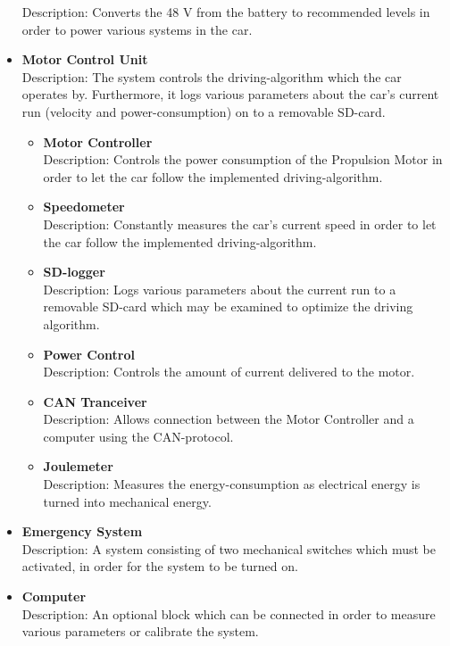 \begin{itemize}
	Description: Converts the 48 V from the battery to recommended levels in order to power various systems in the car.
	\item \textbf{Motor Control Unit}\\
	Description: The system controls the driving-algorithm which the car operates by. Furthermore, it logs various parameters about the car's current run (velocity and power-consumption) on to a removable SD-card.
	\begin{itemize}
		\item \textbf{Motor Controller}\\
		Description: Controls the power consumption of the Propulsion Motor in order to let the car follow the implemented driving-algorithm. 
		\item \textbf{Speedometer}\\
		Description: Constantly measures the car's current speed in order to let the car follow the implemented driving-algorithm.
		\item \textbf{SD-logger}\\
		Description: Logs various parameters about the current run to a removable SD-card which may be examined to optimize the driving algorithm.
		\item \textbf{Power Control}\\
		Description: Controls the amount of current delivered to the motor.
		\item \textbf{CAN Tranceiver}\\
		Description: Allows connection between the Motor Controller and a computer using the CAN-protocol.
		\item \textbf{Joulemeter}\\ 
		Description: Measures the energy-consumption as electrical energy is turned into mechanical energy.
	\end{itemize}
	\item \textbf{Emergency System}\\
	Description: A system  consisting of two mechanical switches  which must be activated, in order for the system to be turned on.
	\item \textbf{Computer}\\
	Description: An optional block which can be connected in order to measure various parameters or calibrate the system.
\end{itemize}